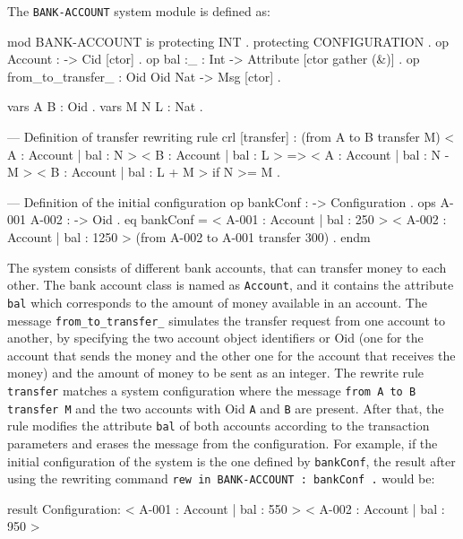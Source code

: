 \begin{example}
\normalfont
The \texttt{BANK-ACCOUNT} system module is defined as: 
\\
\begin{maude}
mod BANK-ACCOUNT is
    protecting INT .
    protecting CONFIGURATION .
    op Account : -> Cid [ctor] .
    op bal :_ : Int -> Attribute [ctor gather (&)] .
    op from_to_transfer_ : Oid Oid Nat -> Msg [ctor] .
    
    vars A B : Oid .
    vars M N L : Nat .

    --- Definition of transfer rewriting rule
    crl [transfer] :
      (from A to B transfer M)
      < A : Account | bal : N >
      < B : Account | bal : L >
      => < A : Account | bal : N - M >
         < B : Account | bal : L + M >
      if N >= M .

    --- Definition of the initial configuration
    op bankConf : -> Configuration .
    ops A-001 A-002 : -> Oid .
    eq bankConf
    = < A-001 : Account | bal : 250 >
      < A-002 : Account | bal : 1250 >
      (from A-002 to A-001 transfer 300) .
endm
\end{maude}
The system consists of different bank accounts, that can transfer money to each other. The bank account class is named as \texttt{Account}, and it contains the attribute \texttt{bal} which corresponds to the amount of money available in an account. The message \texttt{from\_to\_transfer\_} simulates the transfer request from one account to another, by specifying the two account object identifiers or Oid (one for the account that sends the money and the other one for the account that receives the money) and the amount of money to be sent as an integer. The rewrite rule \texttt{transfer} matches a system configuration where the message \texttt{from A to B transfer M} and the two accounts with Oid \texttt{A} and \texttt{B} are present. After that, the rule modifies the attribute \texttt{bal} of both accounts according to the transaction parameters and erases the message from the configuration. For example, if the initial configuration of the system is the one defined by \texttt{bankConf}, the result after using the rewriting command \texttt{rew in BANK-ACCOUNT : bankConf .} would be:
\\
\begin{maude2}
result Configuration: < A-001 : Account | bal : 550 > 
                      < A-002 : Account | bal : 950 >
\end{maude2}

\end{example}

